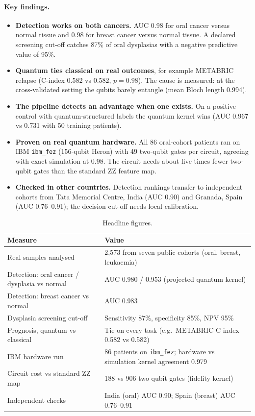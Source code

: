 \documentclass[11pt,a4paper]{article}
\begin{document}
\paragraph{Key findings.}
\begin{itemize}
\item \textbf{Detection works on both cancers.} AUC 0.98 for oral cancer versus normal tissue and 0.98 for breast cancer versus normal tissue. A declared screening cut-off catches 87\% of oral dysplasias with a negative predictive value of 95\%.
\item \textbf{Quantum ties classical on real outcomes}, for example METABRIC relapse (C-index 0.582 vs 0.582, $p = 0.98$). The cause is measured: at the cross-validated setting the qubits barely entangle (mean Bloch length 0.994).
\item \textbf{The pipeline detects an advantage when one exists.} On a positive control with quantum-structured labels the quantum kernel wins (AUC 0.967 vs 0.731 with 50 training patients).
\item \textbf{Proven on real quantum hardware.} All 86 oral-cohort patients ran on IBM \texttt{ibm\_fez} (156-qubit Heron) with 49 two-qubit gates per circuit, agreeing with exact simulation at 0.98. The circuit needs about five times fewer two-qubit gates than the standard ZZ feature map.
\item \textbf{Checked in other countries.} Detection rankings transfer to independent cohorts from Tata Memorial Centre, India (AUC 0.90) and Granada, Spain (AUC 0.76--0.91); the decision cut-off needs local calibration.
\end{itemize}

\begin{table}[H]
\centering
\caption{Headline figures.}
\begin{tabularx}{\textwidth}{@{}l Y@{}}
\toprule
\textbf{Measure} & \textbf{Value} \\
\midrule
Real samples analysed & 2,573 from seven public cohorts (oral, breast, leukaemia) \\
Detection: oral cancer / dysplasia vs normal & AUC 0.980 / 0.953 (projected quantum kernel) \\
Detection: breast cancer vs normal & AUC 0.983 \\
Dysplasia screening cut-off & Sensitivity 87\%, specificity 85\%, NPV 95\% \\
Prognosis, quantum vs classical & Tie on every task (e.g.\ METABRIC C-index 0.582 vs 0.582) \\
IBM hardware run & 86 patients on \texttt{ibm\_fez}; hardware vs simulation kernel agreement 0.979 \\
Circuit cost vs standard ZZ map & 188 vs 906 two-qubit gates (fidelity kernel) \\
Independent checks & India (oral) AUC 0.90; Spain (breast) AUC 0.76--0.91 \\
\bottomrule
\end{tabularx}
\end{table}
\end{document}
